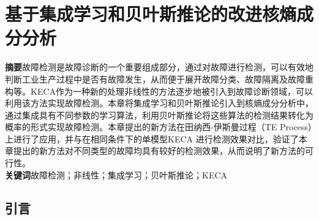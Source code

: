 \chapter{基于集成学习和贝叶斯推论的改进核熵成分分析}

\noindent \textbf{摘要}\quad 故障检测是故障诊断的一个重要组成部分，通过对故障进行检测，可以有效地判断工业生产过程中是否有故障发生，从而便于展开故障分类、故障隔离及故障重构等。KECA作为一种新的处理非线性的方法逐步地被引入到故障诊断领域，可以利用该方法实现故障检测。本章将集成学习和贝叶斯推论引入到核熵成分分析中，通过集成具有不同参数的学习算法，利用贝叶斯推论将这些算法的检测结果转化为概率的形式实现故障检测。本章提出的新方法在田纳西-伊斯曼过程（TE Process）上进行了应用，并与在相同条件下的单模型KECA 进行检测效果对比，验证了本章提出的新方法对不同类型的故障均具有较好的检测效果，从而说明了新方法的可行性。\\
\textbf{关键词}\quad 故障检测；非线性；集成学习；贝叶斯推论；KECA

\section{引言}

